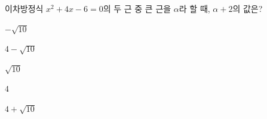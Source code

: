 이차방정식 $x^2+4x-6=0$의 두 근 중 큰 근을 $\alpha$라 할 때, $\alpha+2$의 값은?
\begin{choices32}{\rule[-3ex]{0pt}{8ex}$-\sqrt{10}$}{\rule[-3ex]{0pt}{8ex}$4-\sqrt{10}$}{\rule[-3ex]{0pt}{8ex}$\sqrt{10}$}{\rule[-3ex]{0pt}{8ex}$4$}{\rule[-3ex]{0pt}{8ex}$4+\sqrt{10}$}\end{choices32}

